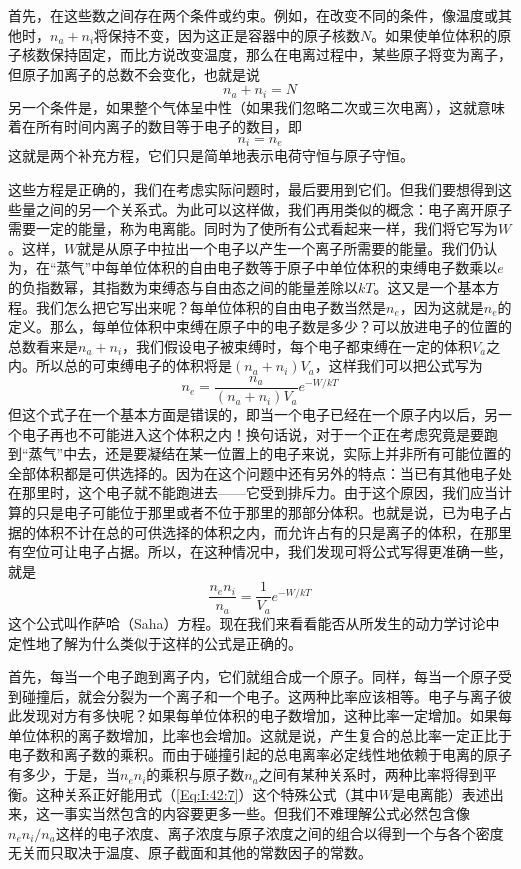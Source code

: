 首先，在这些数之间存在两个条件或约束。例如，在改变不同的条件，像温度或其他时，$n_a+n_i$将保持不变，因为这正是容器中的原子核数$N$。如果使单位体积的原子核数保持固定，而比方说改变温度，那么在电离过程中，某些原子将变为离子，但原子加离子的总数不会变化，也就是说
\begin{equation*}
    n_a+n_i=N
\end{equation*}
另一个条件是，如果整个气体呈中性（如果我们忽略二次或三次电离），这就意味着在所有时间内离子的数目等于电子的数目，即
\begin{equation*}
    n_i=n_e
\end{equation*}
这就是两个补充方程，它们只是简单地表示电荷守恒与原子守恒。

这些方程是正确的，我们在考虑实际问题时，最后要用到它们。但我们要想得到这些量之间的另一个关系式。为此可以这样做，我们再用类似的概念：电子离开原子需要一定的能量，称为电离能。同时为了使所有公式看起来一样，我们将它写为$W$。这样，$W$就是从原子中拉出一个电子以产生一个离子所需要的能量。我们仍认为，在“蒸气”中每单位体积的自由电子数等于原子中单位体积的束缚电子数乘以$e$的负指数幂，其指数为束缚态与自由态之间的能量差除以$kT$。这又是一个基本方程。我们怎么把它写出来呢？每单位体积的自由电子数当然是$n_e$，因为这就是$n_e$的定义。那么，每单位体积中束缚在原子中的电子数是多少？可以放进电子的位置的总数看来是$n_a+n_i$，我们假设电子被束缚时，每个电子都束缚在一定的体积$V_a$之内。所以总的可束缚电子的体积将是$(n_a+n_i)V_a$，这样我们可以把公式写为
\begin{equation*}
    n_e=\frac{n_a}{(n_a+n_i)V_a}e^{-W/kT}
\end{equation*}
但这个式子在一个基本方面是错误的，即当一个电子已经在一个原子内以后，另一个电子再也不可能进入这个体积之内！换句话说，对于一个正在考虑究竟是要跑到“蒸气”中去，还是要凝结在某一位置上的电子来说，实际上并非所有可能位置的全部体积都是可供选择的。因为在这个问题中还有另外的特点：当已有其他电子处在那里时，这个电子就不能跑进去——它受到排斥力。由于这个原因，我们应当计算的只是电子可能位于那里或者不位于那里的那部分体积。也就是说，已为电子占据的体积不计在总的可供选择的体积之内，而允许占有的只是离子的体积，在那里有空位可让电子占据。所以，在这种情况中，我们发现可将公式写得更准确一些，就是
\begin{equation}
    \label{Eq:I:42:7}
    \frac{n_en_i}{n_a} = \frac{1}{V_a}e^{-W/kT}
\end{equation}
这个公式叫作萨哈（Saha）方程。现在我们来看看能否从所发生的动力学讨论中定性地了解为什么类似于这样的公式是正确的。

首先，每当一个电子跑到离子内，它们就组合成一个原子。同样，每当一个原子受到碰撞后，就会分裂为一个离子和一个电子。这两种比率应该相等。电子与离子彼此发现对方有多快呢？如果每单位体积的电子数增加，这种比率一定增加。如果每单位体积的离子数增加，比率也会增加。这就是说，产生复合的总比率一定正比于电子数和离子数的乘积。而由于碰撞引起的总电离率必定线性地依赖于电离的原子有多少，于是，当$n_en_i$的乘积与原子数$n_a$之间有某种关系时，两种比率将得到平衡。这种关系正好能用式（\ref{Eq:I:42:7}）这个特殊公式（其中$W$是电离能）表述出来，这一事实当然包含的内容要更多一些。但我们不难理解公式必然包含像$n_e n_i /n_a$这样的电子浓度、离子浓度与原子浓度之间的组合以得到一个与各个密度无关而只取决于温度、原子截面和其他的常数因子的常数。

